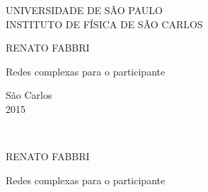 \documentclass[a4paper,openright,12pt]{report} %
\begin{document}




\pagestyle{fancy}


\thispagestyle{empty}

\vspace{0.5cm}

\begin{center} 
\LARGE{UNIVERSIDADE DE SÃO PAULO}  \\
\LARGE{INSTITUTO DE FÍSICA DE SÃO CARLOS}
\end{center}

\vspace{6.0cm}

\centerline{\LARGE{RENATO FABBRI}}

\vspace{3.0cm}


\centerline{\Huge{Redes complexas para o participante}} 
\vspace{0.5cm}


\vspace{6.5cm}

\begin{center}
\Large{S\~ao Carlos}\\
\Large{2015}
\end{center}



\newpage\ \thispagestyle{empty}  \newpage\thispagestyle{empty}

\setcounter{page}{1} %

\begin{center}
\LARGE{RENATO FABBRI}
\end{center}

\addvspace{4.0cm}

\begin{center}
\Huge{Redes complexas para o participante}
\end{center}

\addvspace{3.0cm}
\end{document}
